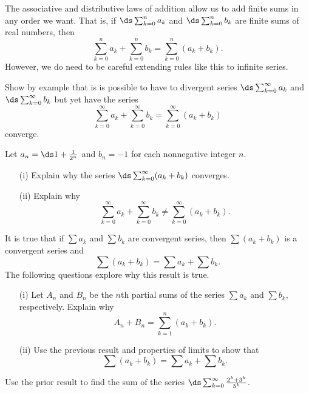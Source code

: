 \begin{exercises}
\begin{exerciseSolution}
\end{exerciseSolution}

\ea	

\item The associative and distributive laws of addition allow us to add finite sums in any order we want. That is, if $\ds \sum_{k=0}^n a_k$ and $\ds \sum_{k=0}^n b_k$ are finite sums of real numbers, then
\[\sum_{k=0}^{n} a_k + \sum_{k=0}^n b_k = \sum_{k=0}^n (a_k+b_k).\]
However, we do need to be careful extending rules like this to infinite series.
\ba
\item Show by example that is is possible to have to divergent series $\ds \sum_{k=0}^{\infty} a_k$ and $\ds \sum_{k=0}^{\infty} b_k$ but yet have the series
\[\sum_{k=0}^{\infty} a_k + \sum_{k=0}^{\infty} b_k = \sum_{k=0}^{\infty} (a_k+b_k)\]
converge.

\item Let $a_n = \ds 1 + \frac{1}{2^n}$ and $b_n = -1$ for each nonnegative integer $n$.
    \begin{itemize}
    \item[(i)] Explain why the series $\ds \sum_{k=0}^{\infty} (a_k+b_k)$ converges.

    \item[(ii)] Explain why
\[\sum_{k=0}^{\infty} a_k + \sum_{k=0}^{\infty} b_k \neq \sum_{k=0}^{\infty} (a_k+b_k).\]

    \end{itemize}

\item It is true that if $\sum a_k$ and $\sum b_k$ are convergent series, then $\sum (a_k+b_k)$ is a convergent series and
\[\sum (a_k+b_k) = \sum a_k + \sum b_k.\]
The following questions explore why this result is true.
    \begin{itemize}
    \item[(i)] Let $A_n$ and $B_n$ be the $n$th partial sums of the series $\sum a_k$ and $\sum b_k$, respectively. Explain why
\[A_n + B_n = \sum_{k=1}^n (a_k+b_k).\]

    \item[(ii)] Use the previous result and properties of limits to show that
\[\sum (a_k+b_k) = \sum a_k + \sum b_k.\]

        \end{itemize}

\item Use the prior result to find the sum of the series $\ds \sum_{k=0}^{\infty} \frac{2^k+3^k}{5^k}$.

\ea


\end{exercises}
